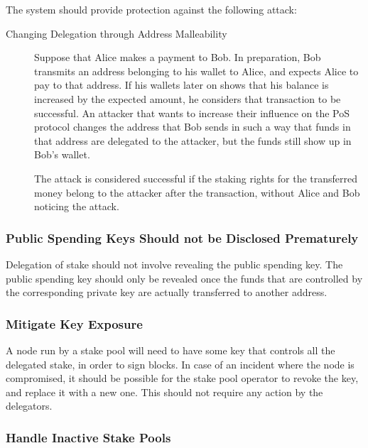 \documentclass[11pt,a4paper]{article}
\begin{document}
The system should provide protection against the following attack:

\begin{description}
\item[Changing Delegation through Address Malleability]
Suppose that Alice makes a payment to Bob. In preparation, Bob transmits
an address belonging to his wallet to Alice, and expects Alice to pay to
that address. If his wallets later on shows that his balance is
increased by the expected amount, he considers that transaction to be
successful. An attacker that wants to increase their influence on the
PoS protocol changes the address that Bob sends in such a way that funds
in that address are delegated to the attacker, but the funds still show
up in Bob's wallet.

The attack is considered successful if the staking rights for the
transferred money belong to the attacker after the transaction, without
Alice and Bob noticing the attack.
\end{description}

\subsubsection{Public Spending Keys Should not be Disclosed
Prematurely}\label{public-spending-keys-should-not-be-disclosed-prematurely}

Delegation of stake should not involve revealing the public spending
key. The public spending key should only be revealed once the funds that
are controlled by the corresponding private key are actually transferred
to another address.

\subsubsection{Mitigate Key Exposure}\label{mitigate-key-exposure}

A node run by a stake pool will need to have some key that controls all
the delegated stake, in order to sign blocks. In case of an incident
where the node is compromised, it should be possible for the stake pool
operator to revoke the key, and replace it with a new one. This should
not require any action by the delegators.

\subsubsection{Handle Inactive Stake
Pools}\label{handle-inactive-stake-pools}
\end{document}
